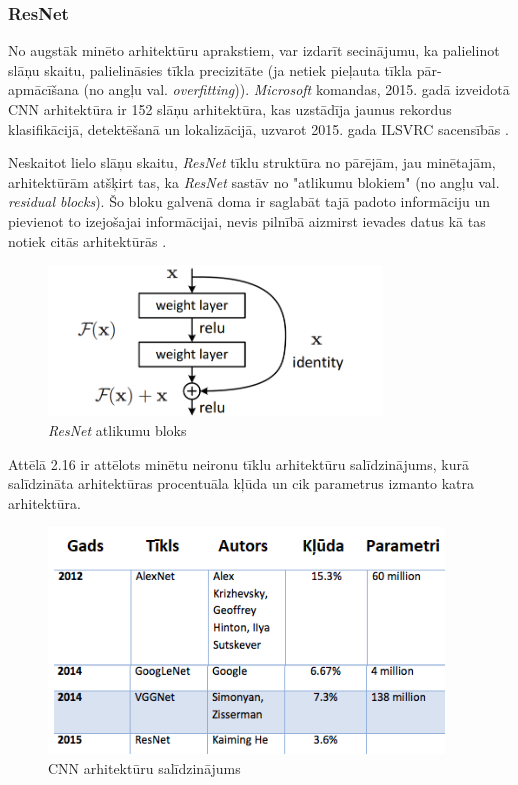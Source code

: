 \subsubsection{ResNet}
No augstāk minēto arhitektūru aprakstiem, var izdarīt secinājumu, ka palielinot slāņu skaitu, palielināsies tīkla precizitāte (ja netiek pieļauta tīkla pār-apmācīšana (no angļu val. \textit{overfitting})). \textit{Microsoft} komandas, 2015. gadā izveidotā CNN arhitektūra ir 152 slāņu arhitektūra, kas uzstādīja jaunus rekordus klasifikācijā, detektēšanā un lokalizācijā, uzvarot 2015. gada ILSVRC sacensībās \cite{ILSVRC15}. 

Neskaitot lielo slāņu skaitu,    \textit{ResNet} tīklu struktūra no pārējām, jau minētajām, arhitektūrām atšķirt tas, ka \textit{ResNet} sastāv no "atlikumu blokiem" (no angļu val. \textit{residual blocks}). Šo bloku galvenā doma ir saglabāt tajā padoto informāciju un pievienot to izejošajai informācijai, nevis pilnībā aizmirst ievades datus kā tas notiek citās arhitektūrās \cite{he2016deep}. 

\begin{figure}[H]%
	\centering
	\includegraphics[height=4cm]{images/resnet.png} %
	\caption{\textit{ResNet} atlikumu bloks \cite{he2016deep}}%
	\label{fig:example}%
\end{figure}

Attēlā 2.16 ir attēlots minētu neironu tīklu arhitektūru salīdzinājums, kurā salīdzināta  arhitektūras procentuāla kļūda un cik parametrus izmanto katra arhitektūra. 

\begin{figure}[H]%
	\centering
	\includegraphics[height=6cm]{images/archsaliidz.png} %
	\caption{CNN arhitektūru salīdzinājums}%
	\label{fig:example}%
\end{figure}

